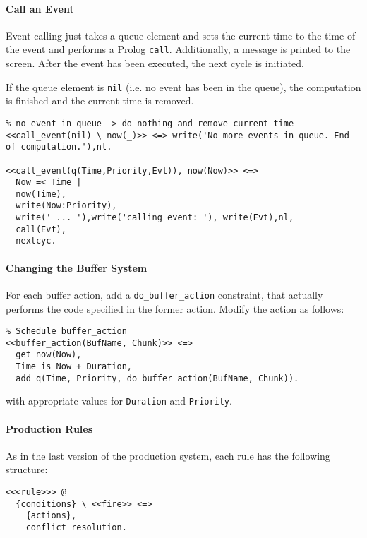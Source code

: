 \paragraph{Call an Event} 

Event calling just takes a queue element and sets the current time to the time of the event and performs a Prolog \lstinline|call|. Additionally, a message is printed to the screen. After the event has been executed, the next cycle is initiated.

If the queue element is \lstinline|nil| (i.e. no event has been in the queue), the computation is finished and the current time is removed.

\begin{lstlisting}
% no event in queue -> do nothing and remove current time
<<call_event(nil) \ now(_)>> <=> write('No more events in queue. End of computation.'),nl.

<<call_event(q(Time,Priority,Evt)), now(Now)>> <=> 
  Now =< Time | 
  now(Time),
  write(Now:Priority),
  write(' ... '),write('calling event: '), write(Evt),nl,
  call(Evt),
  nextcyc.
\end{lstlisting}

\paragraph{Changing the Buffer System}
\label{changing_the_buffer_system}

For each buffer action, add a \lstinline|do_buffer_action| constraint, that actually performs the code specified in the former action. Modify the action as follows:

\begin{lstlisting}
% Schedule buffer_action
<<buffer_action(BufName, Chunk)>> <=> 
  get_now(Now),
  Time is Now + Duration, 
  add_q(Time, Priority, do_buffer_action(BufName, Chunk)). 
\end{lstlisting}

with appropriate values for \lstinline|Duration| and \lstinline|Priority|.

\paragraph{Production Rules}

As in the last version of the production system, each rule has the following structure:

\begin{lstlisting}
<<<rule>>> @
  {conditions} \ <<fire>> <=> 
    {actions}, 
    conflict_resolution.
\end{lstlisting}

